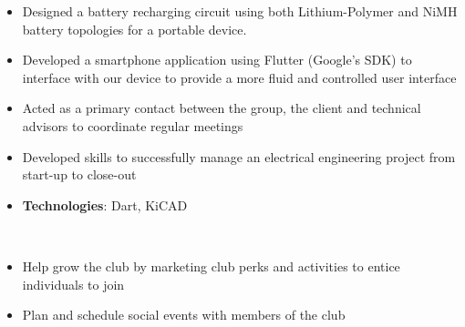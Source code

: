 \documentclass[10pt, letterpaper, ragged2e, withhyper]{altacv}
\begin{document}
\begin{paracol}{2}
            
    
    \begin{itemize}
        \item Designed a battery recharging circuit using both Lithium-Polymer and NiMH battery topologies for a portable device. 
        \item Developed a smartphone application using Flutter (Google's SDK) to interface with our device to provide a more fluid and controlled user interface
        \item Acted as a primary contact between the group, the client and technical advisors to coordinate regular meetings 
        \item Developed skills to successfully manage an electrical engineering project from start-up to close-out
        \item \textbf{Technologies}: Dart, KiCAD 
    \end{itemize}

\switchcolumn

     \\







    \begin{itemize}
        \item Help grow the club by marketing club perks and activities to entice individuals to join
        \item Plan and schedule social events with members of the club
    \end{itemize}


\end{paracol}
\end{document}
